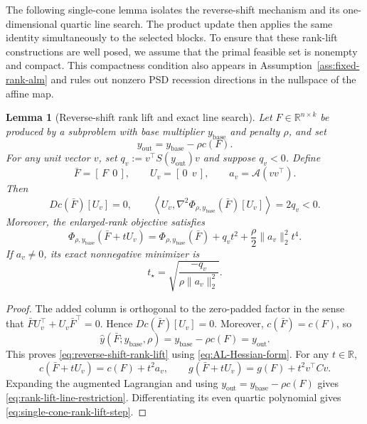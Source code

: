 \documentclass[11pt]{article}
\newtheorem{lemma}{Lemma}
\theoremstyle{definition}
\theoremstyle{remark}
\begin{document}
The following single-cone lemma isolates the reverse-shift mechanism and its
one-dimensional quartic line search.  The product update then applies the
same identity simultaneously to the selected blocks.  To ensure that these
rank-lift constructions are well posed, we assume that the primal feasible
set is nonempty and compact.  This compactness condition also appears in
Assumption~\ref{ass:fixed-rank-alm} and rules out nonzero PSD recession
directions in the nullspace of the affine map.

\begin{lemma}[Reverse-shift rank lift and exact line search]
\label{lem:reverse-shift-rank-lift}
Let $F\in\mathbb R^{n\times k}$ be produced by a subproblem with base
multiplier $y_{\mathrm{base}}$ and penalty $\rho$, and set
\[
  y_{\mathrm{out}}=y_{\mathrm{base}}-\rho c(F).
\]
For any unit vector $v$, set
$q_v:=v^\top S(y_{\mathrm{out}})v$ and suppose $q_v<0$.  Define
\[
  \bar F=[\,F\ \ 0\,],
  \qquad
  U_v=[\,0\ \ v\,],
  \qquad
  a_v=\mathcal A(vv^\top).
\]
Then
\begin{equation}
  Dc(\bar F)[U_v]=0,
  \qquad
  \left\langle
    U_v,\nabla^2\Phi_{\rho,y_{\mathrm{base}}}(\bar F)[U_v]
  \right\rangle
  =2q_v<0.
  \label{eq:reverse-shift-rank-lift}
\end{equation}
Moreover, the enlarged-rank objective satisfies
\begin{equation}
  \Phi_{\rho,y_{\mathrm{base}}}(\bar F+tU_v)
  =
  \Phi_{\rho,y_{\mathrm{base}}}(\bar F)
  +q_vt^2+\frac{\rho}{2}\|a_v\|_2^2t^4.
  \label{eq:rank-lift-line-restriction}
\end{equation}
If $a_v\neq0$, its exact nonnegative minimizer is
\begin{equation}
  t_\star
  =
  \sqrt{\frac{-q_v}{\rho\|a_v\|_2^2}}.
  \label{eq:single-cone-rank-lift-step}
\end{equation}
\end{lemma}

\begin{proof}
The added column is orthogonal to the zero-padded factor in the sense that
$\bar F U_v^\top+U_v\bar F^\top=0$.  Hence
$Dc(\bar F)[U_v]=0$.  Moreover, $c(\bar F)=c(F)$, so
\[
  \widehat y(\bar F;y_{\mathrm{base}},\rho)
  =y_{\mathrm{base}}-\rho c(F)
  =y_{\mathrm{out}}.
\]
This proves \eqref{eq:reverse-shift-rank-lift} using
\eqref{eq:AL-Hessian-form}.  For any $t\in\mathbb R$,
\[
  c(\bar F+tU_v)=c(F)+t^2a_v,
  \qquad
  g(\bar F+tU_v)=g(F)+t^2v^\top Cv.
\]
Expanding the augmented Lagrangian and using
$y_{\mathrm{out}}=y_{\mathrm{base}}-\rho c(F)$ gives
\eqref{eq:rank-lift-line-restriction}.  Differentiating its even quartic
polynomial gives \eqref{eq:single-cone-rank-lift-step}.
\end{proof}
\end{document}

